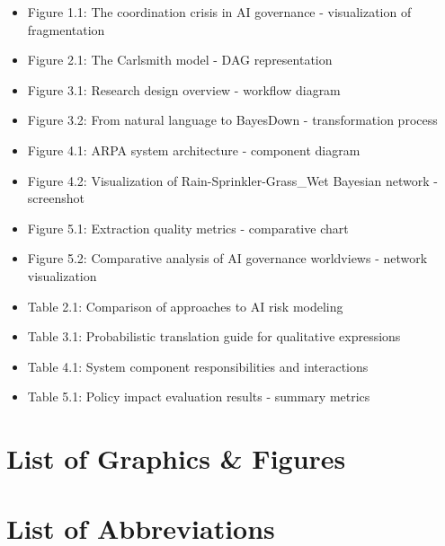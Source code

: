 \documentclass[
  letterpaper,
]{book}
\providecommand{\tightlist}{%
  \setlength{\itemsep}{0pt}\setlength{\parskip}{0pt}}
\begin{document}
\begin{itemize}
\tightlist
\item
  Figure 1.1: The coordination crisis in AI governance - visualization
  of fragmentation\\
\item
  Figure 2.1: The Carlsmith model - DAG representation\\
\item
  Figure 3.1: Research design overview - workflow diagram\\
\item
  Figure 3.2: From natural language to BayesDown - transformation
  process\\
\item
  Figure 4.1: ARPA system architecture - component diagram\\
\item
  Figure 4.2: Visualization of Rain-Sprinkler-Grass\_Wet Bayesian
  network - screenshot\\
\item
  Figure 5.1: Extraction quality metrics - comparative chart\\
\item
  Figure 5.2: Comparative analysis of AI governance worldviews - network
  visualization\\
\item
  Table 2.1: Comparison of approaches to AI risk modeling\\
\item
  Table 3.1: Probabilistic translation guide for qualitative
  expressions\\
\item
  Table 4.1: System component responsibilities and interactions\\
\item
  Table 5.1: Policy impact evaluation results - summary metrics
\end{itemize}

\section*{List of Graphics \& Figures}\label{list-of-graphics-figures}


\section*{List of Abbreviations}\label{list-of-abbreviations}
\end{document}
